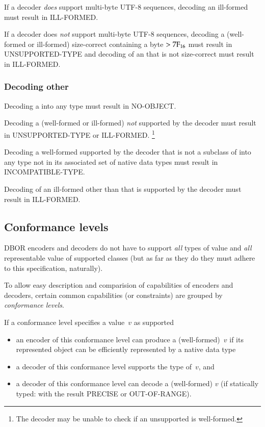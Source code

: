 \medskip
If a decoder \emph{does} support multi-byte UTF-8 sequences,
decoding an ill-formed \DborUtfEightStringValue{} must result in ILL-FORMED.

\medskip
If a decoder does \emph{not} support multi-byte UTF-8 sequences,
decoding a (well-formed or ill-formed) size-correct \DborUtfEightStringValue{} containing a byte $> \mathrm{7F}_{16}$
must result in UNSUPPORTED-TYPE and
decoding of an \DborUtfEightStringValue{} that is not size-correct must result in ILL-FORMED.


\subsubsection{Decoding other \DborValue}

Decoding a \DborNoneValue{} into any type must result in NO-OBJECT.

\medskip
Decoding a (well-formed or ill-formed) \DborValue{} \emph{not} supported by the decoder
must result in UNSUPPORTED-TYPE or ILL-FORMED.%
\footnote{%
    The decoder may be unable to check if an unsupported \DborValue{} is well-formed.
}

\medskip
Decoding a well-formed \DborValue{} supported by the decoder that is not a subclass of \DborNumberValue{}
into any type not in its associated set of native data types must result in INCOMPATIBLE-TYPE.

\medskip
Decoding of an ill-formed \DborValue{} other than \DborUtfEightStringValue{}
that is supported by the decoder must result in ILL-FORMED.


\subsection{Conformance levels}
\label{sec:conformancelevels}

DBOR encoders and decoders do not have to support \emph{all} types of value and \emph{all} representable value
of supported classes (but as far as they do they must adhere to this specification, naturally).

To allow easy description and comparision of capabilities of encoders and decoders,
certain common capabilities (or constraints) are grouped by \emph{conformance levels}.

If a conformance level specifies a value~$v$ as supported
\begin{itemize}
    \item
    an encoder of this conformance level can produce a (well-formed)~$v$ if its represented object can be
    efficiently represented by a native data type

    \item
    a decoder of this conformance level supports the type of~$v$, and

    \item
    a decoder of this conformance level can decode a (well-formed) $v$
    (if statically typed: with the result PRECISE or OUT-OF-RANGE).
\end{itemize}


